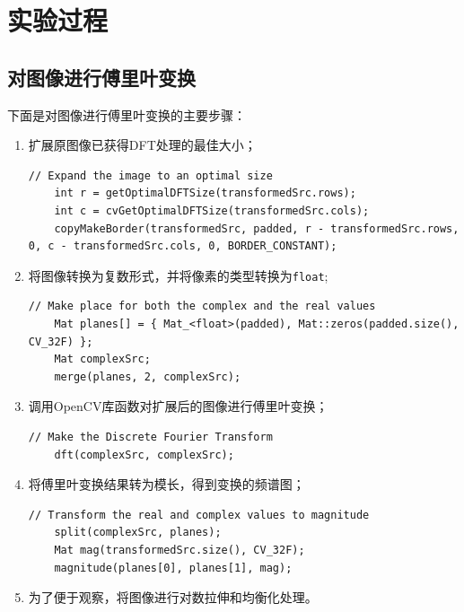 \documentclass[hyperref,UTF8]{ctexart}
\begin{document}

\section{实验过程}

\subsection{对图像进行傅里叶变换}

下面是对图像进行傅里叶变换的主要步骤：

\begin{enumerate}

\item 扩展原图像已获得DFT处理的最佳大小；

\begin{lstlisting}
// Expand the image to an optimal size
	int r = getOptimalDFTSize(transformedSrc.rows);
	int c = cvGetOptimalDFTSize(transformedSrc.cols);
	copyMakeBorder(transformedSrc, padded, r - transformedSrc.rows, 0, c - transformedSrc.cols, 0, BORDER_CONSTANT);
\end{lstlisting}
\item 将图像转换为复数形式，并将像素的类型转换为\lstinline{float};

\begin{lstlisting}
// Make place for both the complex and the real values
	Mat planes[] = { Mat_<float>(padded), Mat::zeros(padded.size(), CV_32F) };
	Mat complexSrc;
	merge(planes, 2, complexSrc);
\end{lstlisting}

\item 调用OpenCV库函数对扩展后的图像进行傅里叶变换；
\begin{lstlisting}
// Make the Discrete Fourier Transform
	dft(complexSrc, complexSrc);
\end{lstlisting}
\item 将傅里叶变换结果转为模长，得到变换的频谱图；

\begin{lstlisting}
// Transform the real and complex values to magnitude
	split(complexSrc, planes);
	Mat mag(transformedSrc.size(), CV_32F);
	magnitude(planes[0], planes[1], mag);
\end{lstlisting}

\item 为了便于观察，将图像进行对数拉伸和均衡化处理。


\end{enumerate}
\end{document}
